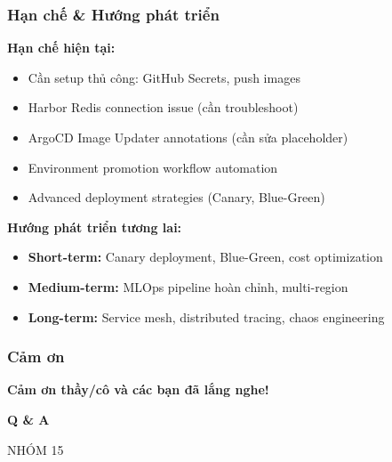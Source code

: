 \documentclass[aspectratio=169]{beamer}
\begin{document}
\begin{frame}
\frametitle{Hạn chế \& Hướng phát triển}
\textbf{Hạn chế hiện tại:}
\begin{itemize}
    \item[$\sim$] Cần setup thủ công: GitHub Secrets, push images
    \item[$\sim$] Harbor Redis connection issue (cần troubleshoot)
    \item[$\sim$] ArgoCD Image Updater annotations (cần sửa placeholder)
    \item[$\sim$] Environment promotion workflow automation
    \item[$\sim$] Advanced deployment strategies (Canary, Blue-Green)
\end{itemize}

\vspace{0.3cm}
\textbf{Hướng phát triển tương lai:}
\begin{itemize}
    \item \textbf{Short-term:} Canary deployment, Blue-Green, cost optimization
    \item \textbf{Medium-term:} MLOps pipeline hoàn chỉnh, multi-region
    \item \textbf{Long-term:} Service mesh, distributed tracing, chaos engineering
\end{itemize}
\end{frame}

\begin{frame}
\frametitle{Cảm ơn}
\begin{center}
\Large
\textbf{Cảm ơn thầy/cô và các bạn đã lắng nghe!}

\vspace{1cm}
\textbf{Q \& A}

\vspace{0.5cm}
\normalsize
NHÓM 15
\end{center}
\end{frame}
\end{document}
